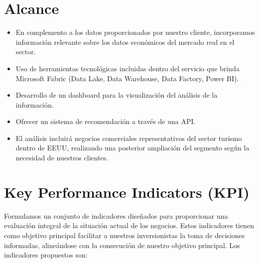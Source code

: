 \documentclass[12pt]{article}
\begin{document}
\section{Alcance}

\begin{itemize}
    \item En complemento a los datos proporcionados por nuestro cliente, incorporamos información relevante sobre los datos económicos del mercado real en el sector.
    \item Uso de herramientas tecnológicas incluidas dentro del servicio que brinda Microsoft Fabric (Data Lake, Data Warehouse, Data Factory, Power BI).
    \item Desarrollo de un dashboard para la visualización del análisis de la información.
    \item Ofrecer un sistema de recomendación a través de una API.
    \item El análisis incluirá negocios comerciales representativos del sector turismo dentro de EEUU, realizando una posterior ampliación del segmento según la necesidad de nuestros clientes.
\end{itemize}

\section{Key Performance Indicators (KPI)}

Formulamos un conjunto de indicadores diseñados para proporcionar una evaluación integral de la situación actual de los negocios. Estos indicadores tienen como objetivo principal facilitar a nuestros inversionistas la toma de decisiones informadas, alineándose con la consecución de nuestro objetivo principal. Los indicadores propuestos son:
\end{document}
